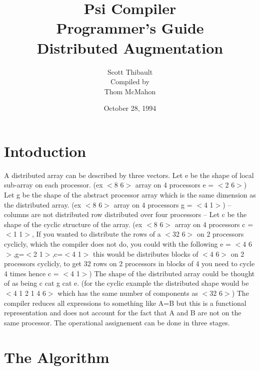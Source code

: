 \newcommand{\cat}{+\!\!\!\!+}
\newcommand{\take}{\,\bigtriangleup\,}
\newcommand{\drop}{\,\bigtriangledown\,}
\newcommand{\karate}{\!\widehat{\hbox to 10pt{}}\!}
\newcommand{\rshp}{\widehat{\rho}}
\newcommand{\one}{$<$\! 1\!$>$}
\newtheorem{definition}{Definition}
\newcommand{\Size}{\tau\,}
\newcommand{\Dim}{\delta\,}
\newcommand{\Ravel}{\,\mbox{\tt rav}\,}
\newcommand{\Reshape}{\,\widehat{\rho}\,}
\newcommand{\Reduce}{\,\mbox{\tt red}\,}

\title{Psi Compiler\\Programmer's Guide\\Distributed Augmentation}
\author{Scott Thibault\\Compiled by\\Thom McMahon}
\date{October 28, 1994}


\maketitle
\section*{Intoduction}
A distributed array can be described by three vectors.  
Let e be the shape of local sub-array on each processor.
(ex $<$8 6$>$ array on 4 processors e = $<$2 6$>$)
Let g be the shape of the abstract processor array which is the
same dimension as the distributed array.
(ex $<$8 6$>$ array on 4 processors g = $<$4 1$>$) --
columns are not distributed row distributed over four processors  --
Let c be the shape of the cyclic structure of the array.
(ex $<$8 6$>$ array on 4 processors c = $<$1 1$>$, If you wanted to 
distribute the rows of a $<$32 6$>$ on 2 processors cyclicly, which the 
compiler does not do, you could with the following 
e = $<$4 6$>$,g=$<$2 1$>$,c=$<$4 1$>$
this would be distributes blocks of $<$4 6$>$ on 2 processors cyclicly,
to get 32 rows on 2 processors in blocks of 4 you need to cycle 4 times
hence c = $<$4 1$>$)
The shape of the distributed array could be thought of as being 
c cat g cat e.
(for the cyclic example the distributed shape would be $<$4 1 2 1 4 6$>$
which has the same number of components as $<$32 6$>$)
The compiler reduces all expressions to something like A=B but this
is a functional representation and does not account for the fact that
A and B are not on the same processor.  The operational assignement
can be done in three stages.  
\section*{The Algorithm}
